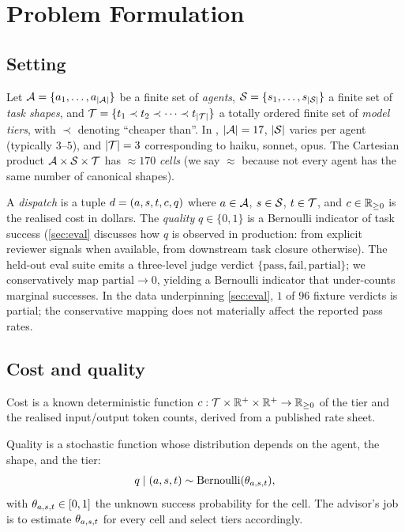 \section{Problem Formulation}
\label{sec:problem}

\subsection{Setting}

Let $\mathcal{A} = \{a_1, \ldots, a_{|\mathcal{A}|}\}$ be a finite set
of \emph{agents}, $\mathcal{S} = \{s_1, \ldots, s_{|\mathcal{S}|}\}$ a
finite set of \emph{task shapes}, and
$\mathcal{T} = \{t_1 \prec t_2 \prec \cdots \prec t_{|\mathcal{T}|}\}$
a totally ordered finite set of \emph{model tiers}, with $\prec$ denoting
``cheaper than''. In \blackrim, $|\mathcal{A}| = 17$, $|\mathcal{S}|$ varies
per agent (typically $3$--$5$), and $|\mathcal{T}| = 3$ corresponding to haiku,
sonnet, opus. The Cartesian product $\mathcal{A} \times \mathcal{S} \times
\mathcal{T}$ has $\approx 170$ \emph{cells} (we say $\approx$ because not every
agent has the same number of canonical shapes).

A \emph{dispatch} is a tuple $d = (a, s, t, c, q)$ where
$a \in \mathcal{A}$, $s \in \mathcal{S}$, $t \in \mathcal{T}$, and
$c \in \mathbb{R}_{\geq 0}$ is the realised cost in dollars. The
\emph{quality} $q \in \{0, 1\}$ is a Bernoulli indicator of task success
(\cref{sec:eval} discusses how $q$ is observed in production: from explicit
reviewer signals when available, from downstream task closure otherwise).
The held-out eval suite emits a three-level judge verdict $\{\mathrm{pass},
\mathrm{fail}, \mathrm{partial}\}$; we conservatively map $\mathrm{partial}
\to 0$, yielding a Bernoulli indicator that under-counts marginal
successes. In the data underpinning \cref{sec:eval}, $1$ of $96$ fixture
verdicts is partial; the conservative mapping does not materially affect
the reported pass rates.

\subsection{Cost and quality}

Cost is a known deterministic function $c : \mathcal{T} \times \mathbb{R}^+
\times \mathbb{R}^+ \to \mathbb{R}_{\geq 0}$ of the tier and the realised
input/output token counts, derived from a published rate sheet.

Quality is a stochastic function whose distribution depends on the agent,
the shape, and the tier:
\begin{equation}
  q \mid (a, s, t) \sim \mathrm{Bernoulli}(\theta_{a,s,t}),
  \label{eq:bernoulli}
\end{equation}
with $\theta_{a,s,t} \in [0,1]$ the unknown success
probability for the cell. The advisor's job is to estimate
$\theta_{a,s,t}$ for every cell and select tiers accordingly.

